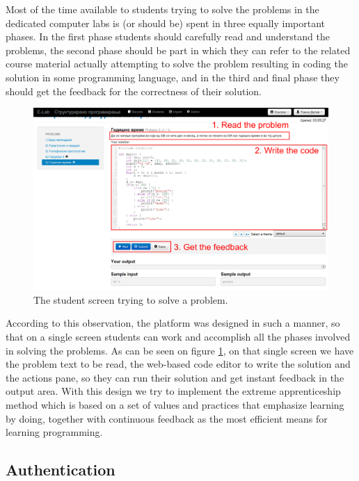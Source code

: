 \documentclass{llncs}
\begin{document}
Most of the time available to students trying to solve the problems in the
dedicated computer labs is (or should be) spent in three equally important
phases. In the first phase students should carefully read and understand the
problems, the second phase should be part in which they can refer to the related
course material actually attempting to solve the problem resulting in coding the
solution in some programming language, and in the third and final phase they
should get the feedback for the correctness of their solution.

\begin{figure}
\centering
\includegraphics[width=.99\textwidth]{e-lab/user_screen}
\caption{The student screen trying to solve a problem.}
\label{fig:student_screen}
\end{figure}

According to this observation, the platform was designed in such a manner, so
that on a single screen students can work and accomplish all the phases involved
in solving the problems. As can be seen on figure \ref{fig:student_screen}, on
that single screen we have the problem text to be read, the web-based code editor to write the
solution and the actions pane, so they can run their solution and get instant
feedback in the output area. With this design we try to implement the extreme
apprenticeship method \cite{vihavainen2011extreme} which is based on a set of
values and practices that emphasize learning by doing, together with continuous feedback as the most
efficient means for learning programming.

\subsection{Authentication}
\end{document}
